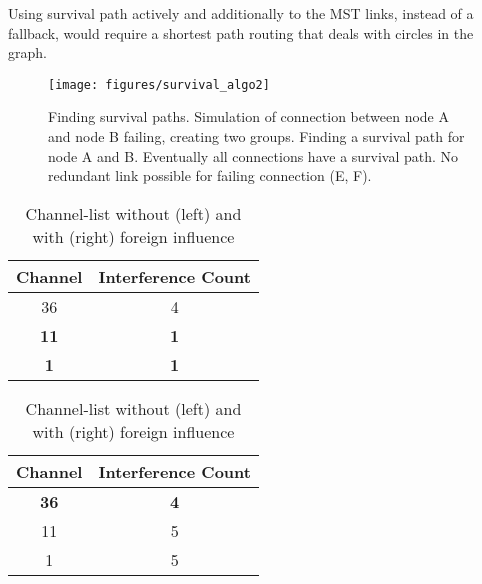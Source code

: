     Using survival path actively and additionally to the \ac{MST} links, instead of a fallback, 
    would require a shortest path routing that deals with circles in the graph.
   
    \begin{figure}[h!]
      \centering
      \texttt{[image: figures/survival\_algo2]}
      \caption{Finding survival paths. Simulation of connection between node A and node B failing, creating two groups.
	Finding a survival path for node A and B.
	Eventually all connections have a survival path.
	No redundant link possible for failing connection (E, F).}
      \label{fig:survival_algo}
    \end{figure}
    
    \begin{table}[h!]
      \centering
      \begin{tabular}{|c|c|}\hline
	Channel & Interference Count\\ \hline
	36 & 4 \\ \hline
	\textbf{11} & \textbf{1} \\ \hline
	\textbf{1} & \textbf{1} \\ \hline
      \end{tabular}
      \begin{tabular}{|c|c|}\hline
	Channel & Interference Count\\ \hline
	\textbf{36} & \textbf{4} \\ \hline
	11 & 5 \\ \hline
	1 & 5  \\ \hline
      \end{tabular}
      \caption{Channel-list without (left) and with (right) foreign influence}
    \end{table}
    
\newpage
    
